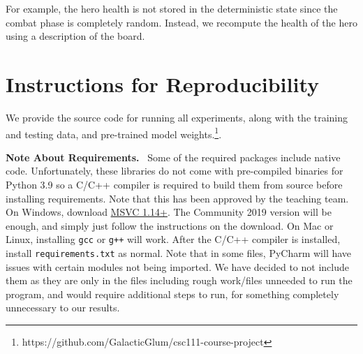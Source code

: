 \documentclass{paper}
\newcommand{\inlineSection}[1]{\vspace{0.5em}\noindent\textbf{#1.}~}
\begin{document}
For example, the hero health is not stored in the deterministic state since the combat phase is completely random. Instead, we recompute the health of the hero using a description of the board.



\section{Instructions for Reproducibility}
We provide the source code for running all experiments, along with the training and testing data, and pre-trained model weights.\footnote{https://github.com/GalacticGlum/csc111-course-project}.

\inlineSection{Note About Requirements} Some of the required packages include native code. Unfortunately, these libraries do not come with pre-compiled binaries for Python 3.9 so a C/C++ compiler is required to build them from source before installing requirements. Note that this has been approved by the teaching team. On Windows, download \textcolor{blue}{\href{https://visualstudio.microsoft.com/vs/features/cplusplus/}{MSVC 1.14+}}. The Community 2019 version will be enough, and simply just follow the instructions on the download. On Mac or Linux, installing \texttt{gcc} or \texttt{g++} will work. After the C/C++ compiler is  installed, install \texttt{requirements.txt} as normal. Note that in some files, PyCharm will have issues with certain modules not being imported. We have decided to not include them as they are only in the files including rough work/files unneeded to run the program, and would require additional steps to run, for something completely unnecessary to our results.
\end{document}
